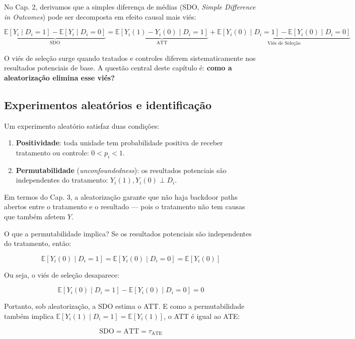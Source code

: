 \documentclass[
]{article}
\begin{document}
No Cap. 2, derivamos que a simples diferença de médias (SDO, \emph{Simple Difference in Outcomes}) pode ser decomposta em efeito causal mais viés:

\[\underbrace{\mathbb{E}[Y_i \mid D_i=1] - \mathbb{E}[Y_i \mid D_i=0]}_{\text{SDO}} = \underbrace{\mathbb{E}[Y_i(1) - Y_i(0) \mid D_i=1]}_{\text{ATT}} + \underbrace{\mathbb{E}[Y_i(0) \mid D_i=1] - \mathbb{E}[Y_i(0) \mid D_i=0]}_{\text{Viés de Seleção}}\]

O viés de seleção surge quando tratados e controles diferem sistematicamente nos resultados potenciais de base. A questão central deste capítulo é: \textbf{como a aleatorização elimina esse viés?}

\subsection{Experimentos aleatórios e identificação}\label{experimentos-aleatuxf3rios-e-identificauxe7uxe3o}

Um experimento aleatório satisfaz duas condições:

\begin{enumerate}
\def\labelenumi{\arabic{enumi}.}
\item
  \textbf{Positividade}: toda unidade tem probabilidade positiva de receber tratamento ou controle: \(0 < p_i < 1\).
\item
  \textbf{Permutabilidade} (\emph{unconfoundedness}): os resultados potenciais são independentes do tratamento: \(Y_i(1), Y_i(0) \perp D_i\).
\end{enumerate}

Em termos do Cap. 3, a aleatorização garante que não haja backdoor paths abertos entre o tratamento e o resultado --- pois o tratamento não tem causas que também afetem \(Y\).

O que a permutabilidade implica? Se os resultados potenciais são independentes do tratamento, então:

\[\mathbb{E}[Y_i(0) \mid D_i=1] = \mathbb{E}[Y_i(0) \mid D_i=0] = \mathbb{E}[Y_i(0)]\]

Ou seja, o viés de seleção desaparece:

\[\mathbb{E}[Y_i(0) \mid D_i=1] - \mathbb{E}[Y_i(0) \mid D_i=0] = 0\]

Portanto, sob aleatorização, a SDO estima o ATT. E como a permutabilidade também implica \(\mathbb{E}[Y_i(1) \mid D_i=1] = \mathbb{E}[Y_i(1)]\), o ATT é igual ao ATE:

\[\text{SDO} = \text{ATT} = \tau_{\text{ATE}}\]
\end{document}
